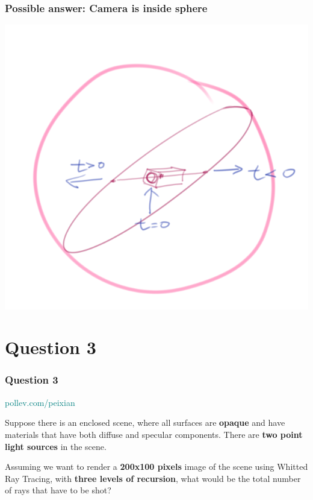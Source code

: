 \documentclass{beamer}
\begin{document}
\begin{frame}
    \frametitle{Possible answer: Camera is inside sphere}

    \begin{center}
        \includegraphics[scale=0.6]{q2.png}
    \end{center}

\end{frame}

\section{Question 3}

\begin{frame}
    \frametitle{Question 3}

    \begin{tcolorbox}[colback=teal!5!white]
        \textcolor{teal}{pollev.com/peixian}
    \end{tcolorbox}

    Suppose there is an enclosed scene, where all surfaces are \textbf{opaque} and have materials 
    that have both diffuse and specular components. There are \textbf{two point light sources} in the scene. 

    \vspace{1em}
    Assuming we want to render a \textbf{200x100 pixels} image of the scene using Whitted Ray Tracing, 
    with \textbf{three levels of recursion}, what would be the total number of rays that have to be shot?
\end{frame}
\end{document}
